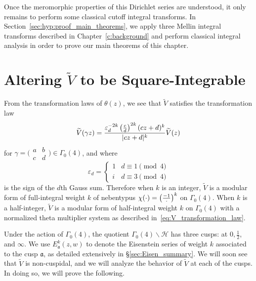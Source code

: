 Once the meromorphic properties of this Dirichlet series are understood, it only remains
to perform some classical cutoff integral transforms.
In Section~\ref{sec:hyp:proof_main_theorems}, we apply three Mellin integral
transforms described in Chapter~\ref{c:background} and perform classical
integral analysis in order to prove our main theorems of this chapter.




\section{Altering $\widetilde{V}$ to be Square-Integrable}



From the transformation laws of $\theta(z)$, we see that $\widetilde{V}$ satisfies the
transformation law
\begin{equation}\label{eq:V_transformation_law}
  \widetilde{V}(\gamma z) = \frac{\varepsilon_d^{-2k} \left(\frac{c}{d}\right)^{2k} (cz+d)^k}{\lvert cz+d
  \rvert^k} \widetilde{V}(z)
\end{equation}
for $\gamma = \Big( \begin{smallmatrix} a&b\\c&d \end{smallmatrix} \Big) \in \Gamma_0(4)$,
and where
\begin{equation}
  \varepsilon_d = \begin{cases}
    1 & d \equiv 1 \pmod 4 \\
    i & d \equiv 3 \pmod 4
  \end{cases}
\end{equation}
is the sign of the $d$th Gauss sum.
Therefore when $k$ is an integer, $\widetilde{V}$ is a modular form of full-integral
weight $k$ of nebentypus $\chi(\cdot) = \left(\frac{-1}{\cdot}\right)^k$ on $\Gamma_0(4)$.
When $k$ is a half-integer, $\widetilde{V}$ is a modular form of half-integral weight $k$
on $\Gamma_0(4)$ with a normalized theta multiplier system as described
in~\eqref{eq:V_transformation_law}.


Under the action of $\Gamma_0(4)$, the quotient $\Gamma_0(4)\backslash\mathcal{H}$
has three cusps: at $0, \frac{1}{2}$, and $\infty$.
We use $E_\mathfrak{a}^k(z,w)$ to denote the Eisenstein series of weight $k$ associated to
the cusp $\mathfrak{a}$, as detailed extensively in \S\ref{sec:Eisen_summary}.
We will soon see that $\widetilde{V}$ is non-cuspidal, and we will analyze the behavior of
$\widetilde{V}$ at each of the cusps.
In doing so, we will prove the following.


